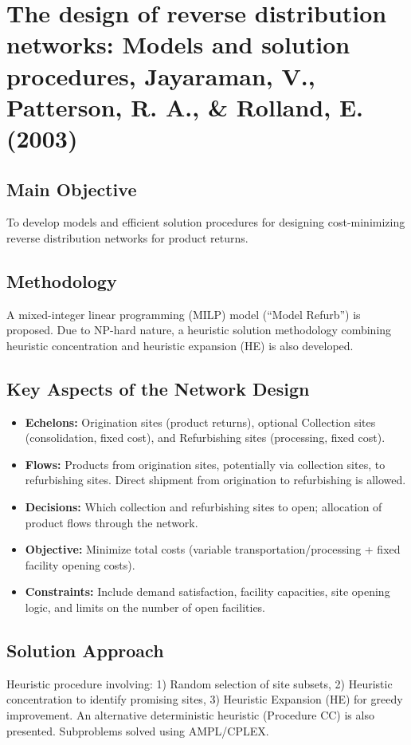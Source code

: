 \section{{The design of reverse distribution networks: Models and solution procedures, Jayaraman, V., Patterson, R. A., \& Rolland, E. (2003)}}

\subsection*{Main Objective}
To develop models and efficient solution procedures for designing cost-minimizing reverse distribution networks for product returns.

\subsection*{Methodology}
A mixed-integer linear programming (MILP) model (``Model Refurb'') is proposed. Due to NP-hard nature, a heuristic solution methodology combining heuristic concentration and heuristic expansion (HE) is also developed.

\subsection*{Key Aspects of the Network Design}
\begin{itemize}
    \item \textbf{Echelons:} Origination sites (product returns), optional Collection sites (consolidation, fixed cost), and Refurbishing sites (processing, fixed cost).
    \item \textbf{Flows:} Products from origination sites, potentially via collection sites, to refurbishing sites. Direct shipment from origination to refurbishing is allowed.
    \item \textbf{Decisions:} Which collection and refurbishing sites to open; allocation of product flows through the network.
    \item \textbf{Objective:} Minimize total costs (variable transportation/processing + fixed facility opening costs).
    \item \textbf{Constraints:} Include demand satisfaction, facility capacities, site opening logic, and limits on the number of open facilities.
\end{itemize}

\subsection*{Solution Approach}
Heuristic procedure involving: 1) Random selection of site subsets, 2) Heuristic concentration to identify promising sites, 3) Heuristic Expansion (HE) for greedy improvement. An alternative deterministic heuristic (Procedure CC) is also presented. Subproblems solved using AMPL/CPLEX.

